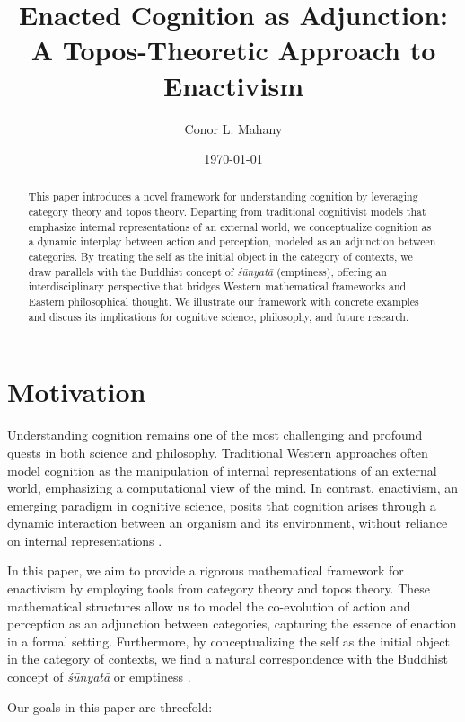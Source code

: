 \documentclass{article}
\title{Enacted Cognition as Adjunction: A Topos-Theoretic Approach to Enactivism}
\author{Conor L. Mahany}
\date{\today}
\begin{document}
\maketitle

\begin{abstract} 
This paper introduces a novel framework for understanding cognition by leveraging category theory and topos theory. Departing from traditional cognitivist models that emphasize internal representations of an external world, we conceptualize cognition as a dynamic interplay between action and perception, modeled as an adjunction between categories. By treating the self as the initial object in the category of contexts, we draw parallels with the Buddhist concept of \emph{śūnyatā} (emptiness), offering an interdisciplinary perspective that bridges Western mathematical frameworks and Eastern philosophical thought. We illustrate our framework with concrete examples and discuss its implications for cognitive science, philosophy, and future research. 
\end{abstract}

\tableofcontents

\section{Motivation}

Understanding cognition remains one of the most challenging and profound quests in both science and philosophy. Traditional Western approaches often model cognition as the manipulation of internal representations of an external world, emphasizing a computational view of the mind. In contrast, enactivism, an emerging paradigm in cognitive science, posits that cognition arises through a dynamic interaction between an organism and its environment, without reliance on internal representations \cite{varela1991}.

In this paper, we aim to provide a rigorous mathematical framework for enactivism by employing tools from category theory and topos theory. These mathematical structures allow us to model the co-evolution of action and perception as an adjunction between categories, capturing the essence of enaction in a formal setting. Furthermore, by conceptualizing the self as the initial object in the category of contexts, we find a natural correspondence with the Buddhist concept of \emph{śūnyatā} or emptiness \cite{garfield1995}.

Our goals in this paper are threefold:
\end{document}
